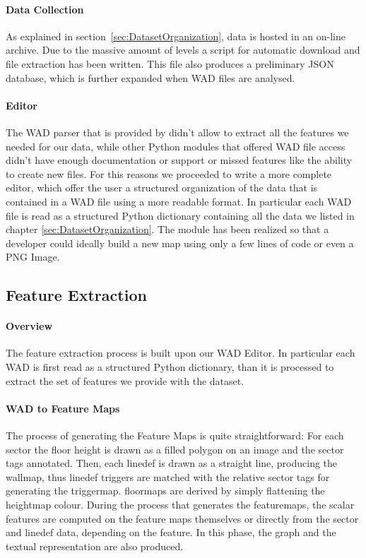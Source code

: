 \paragraph{Data Collection} As explained in  section~\ref{sec:DatasetOrganization}, data is hosted in an on-line archive. Due to the massive amount of levels a script for automatic download and file extraction has been written. This file also produces a preliminary JSON database, which is further expanded when WAD files are analysed.
\paragraph{Editor} The WAD parser that is provided by  didn't allow to extract all the features we needed for our data, while other Python modules that offered WAD file access didn't have enough documentation or support or missed features like the ability to create new files. For this reasons we proceeded to write a more complete editor, which offer the user a structured organization of the data that is contained in a WAD file using a more readable format. In particular each WAD file is read as a structured Python dictionary containing all the data we listed in chapter \ref{sec:DatasetOrganization}. The module has been realized so that a developer could ideally build a new map using only a few lines of code or even a PNG Image.


\subsection{Feature Extraction}
\paragraph{Overview} The feature extraction process is built upon our WAD Editor. In particular each WAD is first read as a structured Python dictionary, than it is processed to extract the set of features we provide with the dataset.
\paragraph{WAD to Feature Maps} The process of generating the Feature Maps is quite straightforward: For each \gls{sector} the floor height is drawn as a filled polygon on an image and the sector tags annotated. Then, each linedef is drawn as a straight line, producing the \gls{wallmap}, thus linedef triggers are matched with the relative sector tags for generating the \gls{triggermap}. \glspl{floormap} are derived by simply flattening the heightmap colour. During the process that generates the \glspl{featuremap}, the scalar features are computed on the feature maps themselves or directly from the sector and linedef data, depending on the feature. In this phase, the graph and the textual representation are also produced. 

